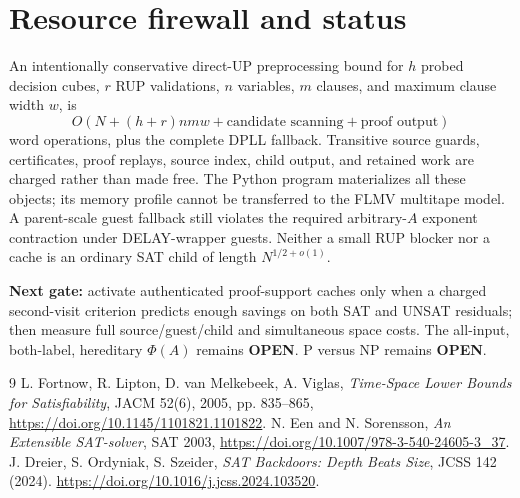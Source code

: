 \documentclass[11pt]{article}
\begin{document}
\section{Resource firewall and status}
An intentionally conservative direct-UP preprocessing bound for $h$
probed decision cubes, $r$ RUP validations, $n$ variables, $m$ clauses,
and maximum clause width $w$, is
\[
 O\!\left(N+(h+r)nmw+\text{candidate scanning}+
 \text{proof output}\right)
\]
word operations, plus the complete DPLL fallback. Transitive source
guards, certificates, proof replays, source index, child output, and
retained work are charged rather than made free. The Python program
materializes all these objects; its memory profile cannot be transferred
to the FLMV multitape model. A parent-scale guest fallback still
violates the required arbitrary-$A$ exponent contraction under
DELAY-wrapper guests. Neither a small RUP blocker nor a cache is an
ordinary SAT child of length $N^{1/2+o(1)}$.

\noindent\textbf{Next gate:} activate authenticated proof-support caches
only when a charged second-visit criterion predicts enough savings
on both SAT and UNSAT residuals; then measure full source/guest/child
and simultaneous space costs. The all-input, both-label, hereditary
$\Phi(A)$ remains \textbf{OPEN}. P versus NP remains \textbf{OPEN}.

\begin{thebibliography}{9}
 L. Fortnow, R. Lipton, D. van Melkebeek, A. Viglas,
\emph{Time-Space Lower Bounds for Satisfiability},
JACM 52(6), 2005, pp. 835--865,
\url{https://doi.org/10.1145/1101821.1101822}.
 N. Een and N. Sorensson,
\emph{An Extensible SAT-solver}, SAT 2003,
\url{https://doi.org/10.1007/978-3-540-24605-3_37}.
 J. Dreier, S. Ordyniak, S. Szeider,
\emph{SAT Backdoors: Depth Beats Size}, JCSS 142 (2024).
\url{https://doi.org/10.1016/j.jcss.2024.103520}.
\end{thebibliography}
\end{document}
